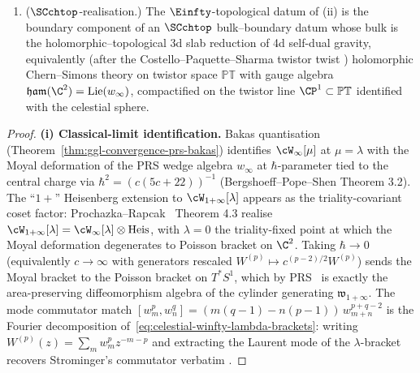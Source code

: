 \begin{theorem}
\begin{enumerate}[label=\textup{(\roman*)}]
\item \textup{($\SCchtop$-realisation.)} The $\Einfty$-topological
datum of (ii) is the boundary component of an
$\SCchtop$ bulk--boundary datum whose bulk is the holomorphic--topological
3d slab reduction of 4d self-dual gravity, equivalently (after the
Costello--Paquette--Sharma twistor twist \cite{CostelloPaquetteSharmaCelestial})
holomorphic Chern--Simons theory on twistor space $\mathbb{PT}$ with
gauge algebra $\mathfrak{ham}(\C^2) = \mathrm{Lie}(w_\infty)$, compactified
on the twistor line $\CP^1 \subset \mathbb{PT}$ identified with the
celestial sphere.
\end{enumerate}
\end{theorem}

\begin{proof}
\textbf{(i) Classical-limit identification.}
Bakas quantisation (Theorem~\ref{thm:ggl-convergence-prs-bakas}) identifies
$\cW_\infty[\mu]$ at $\mu = \lambda$ with the Moyal deformation of the
PRS wedge algebra $w_\infty$ at $\hbar$-parameter tied to the central
charge via $\hbar^2 = (c(5c+22))^{-1}$ (Bergshoeff--Pope--Shen
\cite{BergshoeffPopeShen-Winfty-quantum} Theorem 3.2). The ``$1+$''
Heisenberg extension to $\cW_{1+\infty}[\lambda]$ appears as the
triality-covariant coset factor: Prochazka--Rapcak~\cite{ProchazkaRapcak18}
Theorem 4.3 realise $\cW_{1+\infty}[\lambda] = \cW_\infty[\lambda]
\otimes \mathrm{Heis}$, with $\lambda = 0$ the triality-fixed point at
which the Moyal deformation degenerates to Poisson bracket on $\C^2$.
Taking $\hbar\to 0$ (equivalently $c\to\infty$ with generators rescaled
$W^{(p)} \mapsto c^{(p-2)/2} W^{(p)}$) sends the Moyal bracket to the
Poisson bracket on $T^*S^1$, which by
PRS~\cite{PopeRomansShen-winfty-wedge} is exactly the area-preserving
diffeomorphism algebra of the cylinder generating
$\mathfrak{w}_{1+\infty}$. The mode commutator match
$[w^p_m, w^q_n] = (m(q-1) - n(p-1))\,w^{p+q-2}_{m+n}$ is the Fourier
decomposition of~\eqref{eq:celestial-winfty-lambda-brackets}: writing
$W^{(p)}(z) = \sum_m w^p_m z^{-m-p}$ and extracting the Laurent mode
of the $\lambda$-bracket recovers Strominger's commutator verbatim
\cite[eq.~(1)]{StromingerWInfinityCelestial}.


\end{proof}
